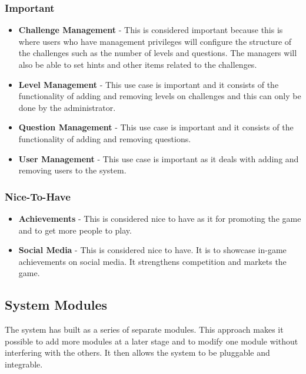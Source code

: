 \documentclass[english]{article}
\begin{document}
		\subsubsection{Important}
		\begin{itemize}
	  		\item \textbf{Challenge Management} - This is considered important because this is where users who have management privileges will configure the structure of the challenges such as the number of levels and questions. The managers will also be able to set hints and other items related to the challenges.
	  		\item \textbf{Level Management} - This use case is important and it consists of the functionality of adding and removing levels on challenges and this can only be done by the administrator. 
	  		\item \textbf{Question Management} - This use case is important and it consists of the functionality of adding and removing questions.
	  		\item \textbf{User Management} - This use case is important as it deals with adding and removing users to the system. 
	   \end{itemize} 
			
		\subsubsection{Nice-To-Have}
		\begin{itemize}
	  		\item \textbf{Achievements} - This is considered nice to have as it for promoting the game and to get more people to play.
	  		\item \textbf{Social Media} - This is considered nice to have. It is to showcase in-game achievements on social media. It strengthens competition and markets the game.
	   \end{itemize}
	   
		\newpage
		\subsection{System Modules}
		The system has built as a series of separate modules. This approach makes it possible to add more modules at a later stage and to modify one module without interfering with the others. It then allows the system to be pluggable and integrable.\newline \newline
		
		
		
\end{document}
